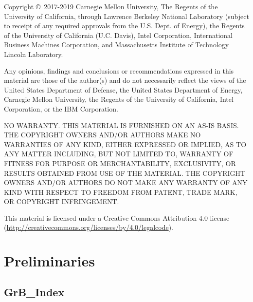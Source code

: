 \documentclass[11pt]{article}
\renewcommand{\thefootnote}{\fnsymbol{footnote}}
\begin{document}
\setlength{\parskip}{0.5\baselineskip}
\setlength{\parindent}{0ex}

\maketitle


\renewcommand{\thefootnote}{\arabic{footnote}}
\setcounter{footnote}{0}

Copyright \copyright\ 2017-2019 Carnegie Mellon University, The Regents 
of the University of California, through Lawrence Berkeley National 
Laboratory (subject to receipt of any required approvals from the 
U.S. Dept. of Energy), the Regents of the University of California 
(U.C. Davis), Intel Corporation, International Business Machines 
Corporation, and Massachusetts Institute of Technology Lincoln
Laboratory. 

Any opinions, findings and conclusions or recommendations expressed in 
this material are those of the author(s) and do not necessarily reflect 
the views of the United States Department of Defense, the United States 
Department of Energy, Carnegie Mellon University, the Regents of the 
University of California, Intel Corporation, or the IBM Corporation.  

NO WARRANTY. THIS MATERIAL IS FURNISHED ON AN AS-IS BASIS. THE COPYRIGHT 
OWNERS AND/OR AUTHORS MAKE NO WARRANTIES OF ANY KIND, EITHER EXPRESSED 
OR IMPLIED, AS TO ANY MATTER INCLUDING, BUT NOT LIMITED TO, WARRANTY OF 
FITNESS FOR PURPOSE OR MERCHANTABILITY, EXCLUSIVITY, OR RESULTS OBTAINED 
FROM USE OF THE MATERIAL. THE COPYRIGHT OWNERS AND/OR AUTHORS DO NOT MAKE 
ANY WARRANTY OF ANY KIND WITH RESPECT TO FREEDOM FROM PATENT, TRADE MARK, 
OR COPYRIGHT INFRINGEMENT.

This material is licensed under a Creative Commons Attribution 4.0 license \\(\href{http://creativecommons.org/licenses/by/4.0/legalcode}{http://creativecommons.org/licenses/by/4.0/legalcode}).

\vfill

\pagebreak
\section{Preliminaries}

\subsection{GrB\_Index}
\end{document}
